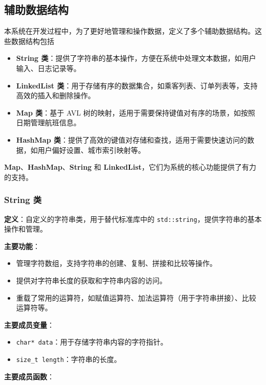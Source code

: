\documentclass[UTF8, a4paper,12pt]{ctexart}
\begin{document}
\subsection{辅助数据结构}

本系统在开发过程中，为了更好地管理和操作数据，定义了多个辅助数据结构。这些数据结构包括
\begin{itemize}
    \item \textbf{String 类}：提供了字符串的基本操作，方便在系统中处理文本数据，如用户输入、日志记录等。
    \item \textbf{LinkedList 类}：用于存储有序的数据集合，如乘客列表、订单列表等，支持高效的插入和删除操作。
    \item \textbf{Map 类}：基于 AVL 树的映射，适用于需要保持键值对有序的场景，如按照日期管理航班信息。
    \item \textbf{HashMap 类}：提供了高效的键值对存储和查找，适用于需要快速访问的数据，如用户偏好设置、城市索引映射等。
\end{itemize}

\textbf{Map}、\textbf{HashMap}、\textbf{String} 和 \textbf{LinkedList}，它们为系统的核心功能提供了有力的支持。

\subsubsection{String 类}

\textbf{定义}：自定义的字符串类，用于替代标准库中的 \texttt{std::string}，提供字符串的基本操作和管理。

\textbf{主要功能}：

\begin{itemize}
    \item 管理字符数组，支持字符串的创建、复制、拼接和比较等操作。
    \item 提供对字符串长度的获取和字符串内容的访问。
    \item 重载了常用的运算符，如赋值运算符、加法运算符（用于字符串拼接）、比较运算符等。
\end{itemize}

\textbf{主要成员变量}：

\begin{itemize}
    \item \texttt{char* data}：用于存储字符串内容的字符指针。
    \item \texttt{size\_t length}：字符串的长度。
\end{itemize}

\textbf{主要成员函数}：
\end{document}
